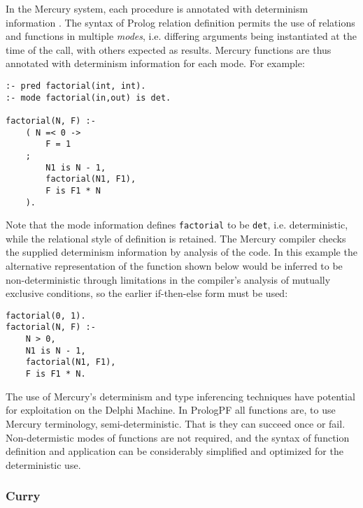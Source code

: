 In the Mercury system, each procedure is annotated with determinism
information \cite{HCSR95}. The syntax of Prolog relation definition
permits the use of relations and functions in multiple \textit{modes},
i.e. differing arguments being instantiated at the time of the call,
with others expected as results.  Mercury functions are thus annotated
with determinism information for each mode.
For example:
\begin{verbatim}
:- pred factorial(int, int).
:- mode factorial(in,out) is det.

factorial(N, F) :-
    ( N =< 0 ->
        F = 1
    ;
        N1 is N - 1,
        factorial(N1, F1),
        F is F1 * N
    ).
\end{verbatim}
Note that the mode information defines \texttt{factorial} to be
\texttt{det}, i.e. deterministic, while the relational style of 
definition is retained.
The Mercury compiler checks the supplied determinism information by
analysis of the code.  In this example the alternative representation of
the function shown below would be inferred to be non-deterministic through
limitations in the compiler's analysis of mutually exclusive conditions,
so the earlier if-then-else form must be used:
\begin{verbatim}
factorial(0, 1).
factorial(N, F) :-
    N > 0,
    N1 is N - 1,
    factorial(N1, F1),
    F is F1 * N.
\end{verbatim}
The use of Mercury's determinism and type inferencing techniques have
potential for exploitation on the Delphi Machine.  In PrologPF all
functions are, to use Mercury terminology, semi-deterministic.  That is
they can succeed once or fail.  Non-determistic modes of functions are
not required, and the syntax of function definition and application can
be considerably simplified and optimized for the deterministic use.

\subsubsection{Curry}

